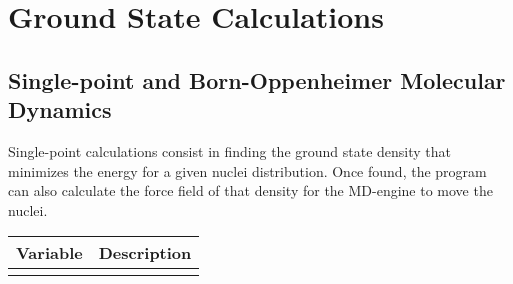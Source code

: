 \chapter{Ground State Calculations}


\section{Single-point and Born-Oppenheimer Molecular Dynamics}

Single-point calculations consist in finding the ground state density that minimizes the energy
for a given nuclei distribution. Once found, the program can also calculate the force field of
that density for the MD-engine to move the nuclei.

\begin{Spacing}{1.0}
  \begin{longtable}{ p{} p{} }
  
      \toprule
      \textbf{Variable} & Description \\*
      \midrule \\*
      \endhead
  

\end{longtable}
\end{Spacing}
